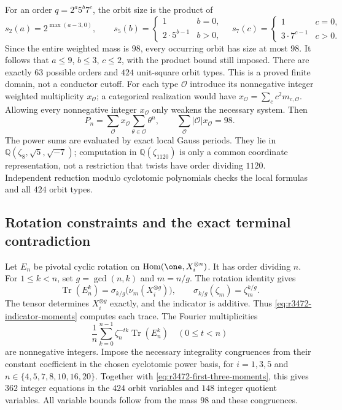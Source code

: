 For an order $q=2^a5^b7^c$, the orbit size is the product of
\[
 s_2(a)=2^{\max(a-3,0)},\qquad
 s_5(b)=\begin{cases}1&b=0,\\2\cdot5^{b-1}&b>0,\end{cases}
 \quad
 s_7(c)=\begin{cases}1&c=0,\\3\cdot7^{c-1}&c>0.\end{cases}
\]
Since the entire weighted mass is $98$, every occurring orbit has size
at most $98$. It follows that $a\leq9$, $b\leq3$, $c\leq2$, with
the product bound still imposed. There are exactly $63$ possible orders
and $424$ unit-square orbit types. This is a proved finite domain, not a
conductor cutoff. For each type $\mathcal O$ introduce its nonnegative
integer weighted multiplicity $x_{\mathcal O}$; a categorical realization
would have $x_{\mathcal O}=\sum_c c^2m_{c,\mathcal O}$. Allowing every
nonnegative integer $x_{\mathcal O}$ only weakens the necessary system.
Then
\[
 P_n=\sum_{\mathcal O}x_{\mathcal O}
             \sum_{\theta\in\mathcal O}\theta^n,
 \qquad \sum_{\mathcal O}|\mathcal O|x_{\mathcal O}=98.
\]
The power sums are evaluated by exact local Gauss periods. They lie in
$\mathbb Q(\zeta_8,\sqrt5,\sqrt{-7})$; computation in
$\mathbb Q(\zeta_{1120})$ is only a common coordinate representation,
not a restriction that twists have order dividing $1120$.
Independent reduction modulo cyclotomic polynomials checks the local
formulas and all $424$ orbit types.

\subsection{Rotation constraints and the exact terminal contradiction}
Let $E_n$ be pivotal cyclic rotation on
$\operatorname{Hom}(\one,X_i^{\otimes n})$. It has order dividing $n$.
For $1\leq k<n$, set $g=\gcd(n,k)$ and $m=n/g$. The rotation identity
\cite[Theorem~5.1 and its proof]{NgHigherPivotal} gives
\[
 \operatorname{Tr}(E_n^k)
   =\sigma_{k/g}\bigl(\nu_m(X_i^{\otimes g})\bigr),
 \qquad \sigma_{k/g}(\zeta_m)=\zeta_m^{k/g}.
\]
The tensor determines $X_i^{\otimes g}$ exactly, and the indicator is
additive. Thus \eqref{eq:r3472-indicator-moments} computes each trace.
The Fourier multiplicities
\[
 \frac1n\sum_{k=0}^{n-1}\zeta_n^{-tk}\operatorname{Tr}(E_n^k)
 \quad(0\leq t<n)
\]
are nonnegative integers. Impose the necessary integrality congruences
from their constant coefficient in the chosen cyclotomic power basis,
for $i=1,3,5$ and
$n\in\{4,5,7,8,10,16,20\}$. Together with
\eqref{eq:r3472-first-three-moments}, this gives $362$ integer equations
in the $424$ orbit variables and $148$ integer quotient variables.
All variable bounds follow from the mass $98$ and these congruences.

